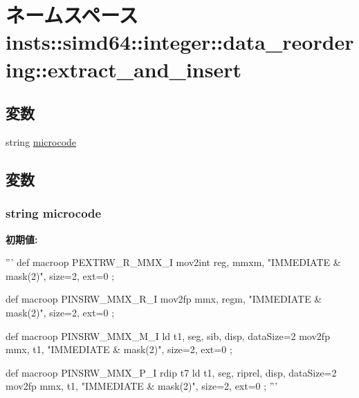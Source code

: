 \hypertarget{namespaceinsts_1_1simd64_1_1integer_1_1data__reordering_1_1extract__and__insert}{
\section{ネームスペース insts::simd64::integer::data\_\-reordering::extract\_\-and\_\-insert}
\label{namespaceinsts_1_1simd64_1_1integer_1_1data__reordering_1_1extract__and__insert}
}
\subsection*{変数}
\begin{DoxyCompactItemize}
\item 
string \hyperlink{namespaceinsts_1_1simd64_1_1integer_1_1data__reordering_1_1extract__and__insert_a770f11a173e99389a8802f0107ed8f52}{microcode}
\end{DoxyCompactItemize}


\subsection{変数}
\hypertarget{namespaceinsts_1_1simd64_1_1integer_1_1data__reordering_1_1extract__and__insert_a770f11a173e99389a8802f0107ed8f52}{
\subsubsection[{microcode}]{\setlength{\rightskip}{0pt plus 5cm}string {\bf microcode}}}
\label{namespaceinsts_1_1simd64_1_1integer_1_1data__reordering_1_1extract__and__insert_a770f11a173e99389a8802f0107ed8f52}
{\bfseries 初期値:}
\begin{DoxyCode}
'''
def macroop PEXTRW_R_MMX_I {
    mov2int reg, mmxm, "IMMEDIATE & mask(2)", size=2, ext=0
};

def macroop PINSRW_MMX_R_I {
    mov2fp mmx, regm, "IMMEDIATE & mask(2)", size=2, ext=0
};

def macroop PINSRW_MMX_M_I {
    ld t1, seg, sib, disp, dataSize=2
    mov2fp mmx, t1, "IMMEDIATE & mask(2)", size=2, ext=0
};

def macroop PINSRW_MMX_P_I {
    rdip t7
    ld t1, seg, riprel, disp, dataSize=2
    mov2fp mmx, t1, "IMMEDIATE & mask(2)", size=2, ext=0
};
'''
\end{DoxyCode}
